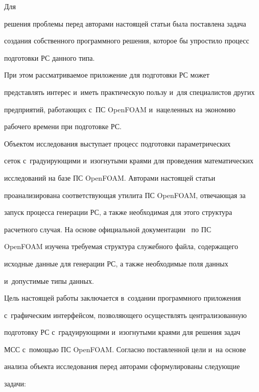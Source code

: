 Для 


решения проблемы перед авторами настоящей статьи была поставлена задача 


создания собственного программного решения, которое бы упростило процесс 


подготовки РС данного типа. 


%  


  При этом рассматриваемое приложение для подготовки РС может 


пред\-став\-лять интерес и~иметь практическую пользу и~для специалистов других 


предприятий, работающих с~ПС OpenFOAM и~нацеленных на экономию 


рабочего времени при подготовке РС.


  


  Объектом исследования выступает процесс подготовки параметрических 


сеток с~градуирующими и~изогнутыми краями для проведения математических 


исследований на базе ПС OpenFOAM. Авторами настоящей статьи 


проанализирована соответствующая утилита ПС OpenFOAM, отвечающая за 


запуск процесса генерации РС, а также необходимая для этого структура 


расчетного случая. На основе официальной документации~\cite{6-ch} по ПС 


OpenFOAM изучена требуемая структура служебного файла, содержащего 


исходные данные для генерации РС, а также необходимые поля данных 


и~допустимые типы данных.


  


  Цель настоящей работы заключается в~создании программного приложения 


с~графическим интерфейсом, позволяющего осуществлять централизованную 


подготовку РС с~градуирующими и~изогнутыми краями для решения задач 


МСС с~помощью ПС OpenFOAM. Согласно поставленной цели и~на основе 


анализа объекта исследования перед авторами сформулированы следующие 


задачи:


